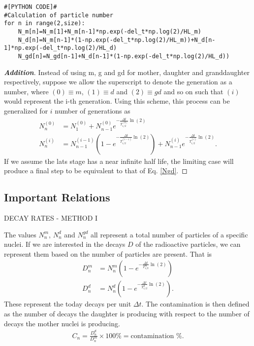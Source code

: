 \documentclass[11pt]{article}
\newenvironment{Addition}
{\let\oldqedsymbol=\qedsymbol
	\renewcommand{\qedsymbol}{$ $}
	\begin{proof}[\bfseries\upshape \color{blue}Addition]\color{blue}}
	{\end{proof}
	\renewcommand{\qedsymbol}{\oldqedsymbol}}
\begin{document}
\begin{lstlisting}
#[PYTHON CODE]#
#Calculation of particle number
for n in range(2,size):
	N_m[n]=N_m[1]+N_m[n-1]*np.exp(-del_t*np.log(2)/HL_m)
	N_d[n]=N_m[n-1]*(1-np.exp(-del_t*np.log(2)/HL_m))+N_d[n-1]*np.exp(-del_t*np.log(2)/HL_d)
	N_gd[n]=N_gd[n-1]+N_d[n-1]*(1-np.exp(-del_t*np.log(2)/HL_d))

\end{lstlisting}

\begin{Addition}
	Instead of using m, g and gd for mother, daughter and granddaughter respectively, suppose we allow the superscript to denote the generation as a number, where $(0) \equiv m$, $(1) \equiv d$ and $(2) \equiv gd$ and so on such that $(i)$ would represent the i-th generation. Using this scheme, this process can be generalized for $i$ number of generations as
	\begin{align}
	N^{(0)}_n &= N^{(0)}_1+N^{(0)}_{n-1}e^{-\frac{\Delta t}{T^{(0)}_{1/2}}\ln(2)} \label{N0} \\
	N^{(i)}_n &= N^{(i-1)}_{n-1}\left(1-e^{-\frac{\Delta t}{T^{(i-1)}_{1/2}}\ln(2)}\right)+N^{(i)}_{n-1}e^{-\frac{\Delta t}{T^{(i)}_{1/2}}\ln(2)}.\label{Ni} 
	\end{align}
	If we assume the lats stage has a near infinite half life, the limiting case will produce a final step to be equivalent to that of Eq. \ref{Ngd}.
\end{Addition}

\subsection{Important Relations}

\begin{center}
	DECAY RATES - METHOD I
\end{center}

The values $N^m_n$, $N^d_n$ and $N^{gd}_n$ all represent a total number of particles of a specific nuclei. If we are interested in the decays $D$ of the radioactive particles, we can represent them based on the number of particles are present. That is
\begin{align}
D^m_n &= N^m_{n}\left(1-e^{-\frac{\Delta t}{T^m_{1/2}}\ln(2)}\right) \\
D^d_n &= N^d_{n}\left(1-e^{-\frac{\Delta t}{T^d_{1/2}}\ln(2)}\right). 
\end{align}
These represent the today decays per unit $\Delta t$. The contamination is then defined as the number of decays the daughter is producing with respect to the number of decays the mother nuclei is producing.
\begin{align}
C_n=\frac{D^d_n}{D^m_n} \times 100  \%=\textrm{contamination \%}. \label{contamination}
\end{align} 
\end{document}
